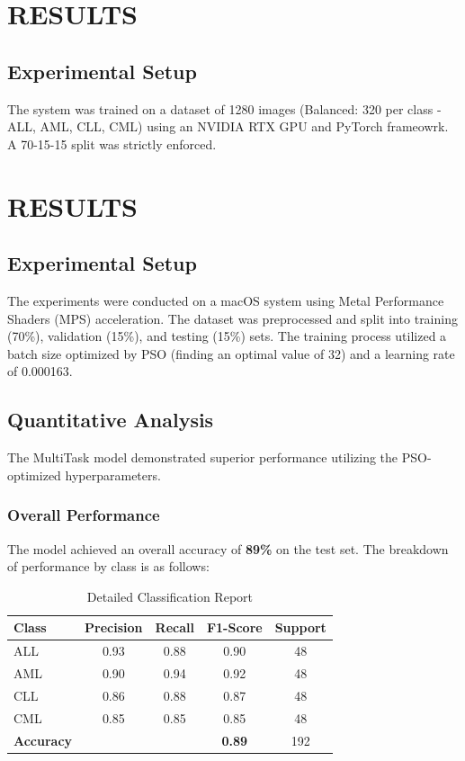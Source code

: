 \documentclass[12pt,a4paper]{article}
\begin{document}
\section{RESULTS}
\subsection{Experimental Setup}
The system was trained on a dataset of 1280 images (Balanced: 320 per class - ALL, AML, CLL, CML) using an NVIDIA RTX GPU and PyTorch frameowrk. A 70-15-15 split was strictly enforced.

\section{RESULTS}
\subsection{Experimental Setup}
The experiments were conducted on a macOS system using Metal Performance Shaders (MPS) acceleration. The dataset was preprocessed and split into training (70\%), validation (15\%), and testing (15\%) sets. The training process utilized a batch size optimized by PSO (finding an optimal value of 32) and a learning rate of 0.000163.

\subsection{Quantitative Analysis}
The MultiTask model demonstrated superior performance utilizing the PSO-optimized hyperparameters.
\subsubsection{Overall Performance}
The model achieved an overall accuracy of \textbf{89\%} on the test set. The breakdown of performance by class is as follows:

\begin{table}[H]
\centering
\caption{Detailed Classification Report}
\label{tab:report}
\begin{tabular}{lcccc}
\toprule
\textbf{Class} & \textbf{Precision} & \textbf{Recall} & \textbf{F1-Score} & \textbf{Support} \\
\midrule
ALL & 0.93 & 0.88 & 0.90 & 48 \\
AML & 0.90 & 0.94 & 0.92 & 48 \\
CLL & 0.86 & 0.88 & 0.87 & 48 \\
CML & 0.85 & 0.85 & 0.85 & 48 \\
\midrule
\textbf{Accuracy} & & & \textbf{0.89} & 192 \\
\bottomrule
\end{tabular}
\end{table}
\end{document}

